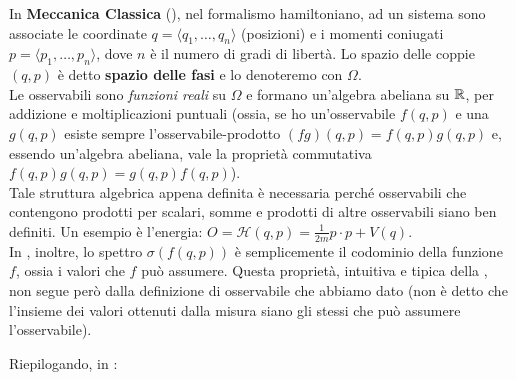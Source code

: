 \documentclass[FisicaTeorica.tex]{subfiles}
\begin{document}
In \textbf{Meccanica Classica} (\MC), nel formalismo hamiltoniano, ad un sistema sono associate le coordinate $q=\langle q_1,\dots, q_n\rangle$ (posizioni) e i momenti coniugati $p=\langle p_1,\dots, p_n\rangle$, dove $n$ è il numero di gradi di libertà. Lo spazio delle coppie $(q,p)$ è detto \textbf{spazio delle fasi} e lo denoteremo con $\Omega$.\\
Le osservabili sono \textit{funzioni reali} su $\Omega$ e formano un'algebra abeliana su $\mathbb{R}$, per addizione e moltiplicazioni puntuali (ossia, se ho un'osservabile $f(q,p)$ e una $g(q,p)$ esiste sempre l'osservabile-prodotto $(fg)(q,p)=f(q,p)g(q,p)$ e, essendo un'algebra abeliana, vale la proprietà commutativa $f(q,p)g(q,p)=g(q,p)f(q,p)$).\\
Tale struttura algebrica appena definita è necessaria perché osservabili che contengono prodotti per scalari, somme e prodotti di altre osservabili siano ben definiti. Un esempio è l'energia: $O=\mathcal{H}(q,p)=\frac{1}{2m} p\cdot p+V(q)$.\\
In \MC, inoltre, lo spettro $\sigma(f(q,p))$ è semplicemente il codominio della funzione $f$, ossia i valori che $f$ può assumere. Questa proprietà, intuitiva e tipica della \MC, non segue però dalla definizione di osservabile che abbiamo dato (non è detto che l'insieme dei valori ottenuti dalla misura siano gli stessi che può assumere l'osservabile).\\
\begin{comment}
\footnote{Nello specifico, questa è un'affermazione a posteriori, quando si scopre che in \MQ gli osservabili sono descritti da \textit{operatori}, per cui chiaramente l'insieme delle misure $\sigma(O)$ non può essere il \q{codominio} di un operatore - non ha senso! Infatti in questo caso vedremo che i valori dell'osservabile sono dati dalle soluzioni di equazioni agli autovalori in cui compare tale operatore. Un'osservabile, in matematica, è proprio l'\textit{entità fisica} che si misura, e deve riprodurne le caratteristiche. Non è per nulla scontato che un'osservabile \textit{rispecchi} le regole algebriche dei reali (es. come la somma di due reali è un reale, così la somma di due osservabili è un'osservabile): per la fisica classica ci va bene che sia così, e quindi ci pare intuitivo, ma scavando nel funzionamento dell'universo e arrivando alla \MQ ci si accorge che non è più così: anzi, continuare con le idee classiche produce contraddizioni con gli esperimenti!}).\\
\end{comment}
Riepilogando, in \MC:
\end{document}
